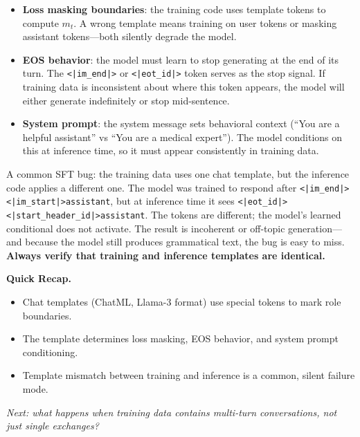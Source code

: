\begin{itemize}[nosep]
  \item \textbf{Loss masking boundaries}: the training code uses template tokens to compute $m_t$. A wrong template means training on user tokens or masking assistant tokens---both silently degrade the model.
  \item \textbf{EOS behavior}: the model must learn to stop generating at the end of its turn. The \texttt{<|im\_end|>} or \texttt{<|eot\_id|>} token serves as the stop signal. If training data is inconsistent about where this token appears, the model will either generate indefinitely or stop mid-sentence.
  \item \textbf{System prompt}: the system message sets behavioral context (``You are a helpful assistant'' vs ``You are a medical expert''). The model conditions on this at inference time, so it must appear consistently in training data.
\end{itemize}

\begin{tcolorbox}[colback=blue!3, colframe=blue!40, title={\small Template Mismatch Is a Silent Failure}]
A common SFT bug: the training data uses one chat template, but the inference code applies a different one. The model was trained to respond after \texttt{<|im\_end|>}\texttt{<|im\_start|>assistant}, but at inference time it sees \texttt{<|eot\_id|>}\texttt{<|start\_header\_id|>assistant}. The tokens are different; the model's learned conditional does not activate. The result is incoherent or off-topic generation---and because the model still produces grammatical text, the bug is easy to miss. \textbf{Always verify that training and inference templates are identical.}
\end{tcolorbox}

\begin{quickrecap}
\textbf{Quick Recap.}
\begin{itemize}[nosep,leftmargin=1.5em]
  \item Chat templates (ChatML, Llama-3 format) use special tokens to mark role boundaries.
  \item The template determines loss masking, EOS behavior, and system prompt conditioning.
  \item Template mismatch between training and inference is a common, silent failure mode.
\end{itemize}
\textit{Next: what happens when training data contains multi-turn conversations, not just single exchanges?}
\end{quickrecap}


